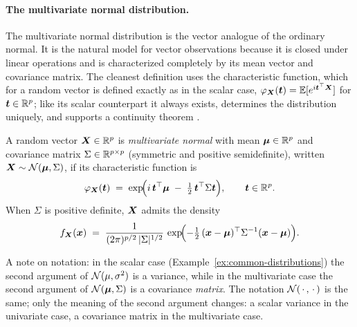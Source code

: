 \paragraph{The multivariate normal distribution.} The multivariate normal distribution is the vector analogue of the ordinary normal. It is the natural model for vector observations because it is closed under linear operations and is characterized completely by its mean vector and covariance matrix. The cleanest definition uses the characteristic function, which for a random vector is defined exactly as in the scalar case, \(\varphi_{\bm{X}}(\bm{t}) = \mathbb{E}[e^{i \bm{t}^{\top} \bm{X}}]\) for \(\bm{t} \in \mathbb{R}^p\); like its scalar counterpart it always exists, determines the distribution uniquely, and supports a continuity theorem \citep[][\S~29]{Billingsley1995}.

\begin{definition}\label{def:mvn}
A random vector \(\bm{X} \in \mathbb{R}^p\) is \emph{multivariate normal} with mean \(\bm{\mu} \in \mathbb{R}^p\) and covariance matrix \(\Sigma \in \mathbb{R}^{p \times p}\) (symmetric and positive semidefinite), written \(\bm{X} \sim \mathcal{N}(\bm{\mu}, \Sigma)\), if its characteristic function is
\begin{equation}
  \varphi_{\bm{X}}(\bm{t}) \;=\; \exp\!\Bigl(i\, \bm{t}^{\top} \bm{\mu} \;-\; \tfrac{1}{2}\, \bm{t}^{\top} \Sigma \bm{t}\Bigr), \qquad \bm{t} \in \mathbb{R}^p.
  \label{eq:mvn-cf}
\end{equation}
When \(\Sigma\) is positive definite, \(\bm{X}\) admits the density
\[
  f_{\bm{X}}(\bm{x}) \;=\; \frac{1}{(2 \pi)^{p/2}\, \lvert\Sigma\rvert^{1/2}}\, \exp\!\Bigl(-\tfrac{1}{2}\, (\bm{x} - \bm{\mu})^{\top} \Sigma^{-1} (\bm{x} - \bm{\mu})\Bigr).
\]
\end{definition}

A note on notation: in the scalar case (Example~\ref{ex:common-distributions}) the second argument of \(\mathcal{N}(\mu, \sigma^2)\) is a variance, while in the multivariate case the second argument of \(\mathcal{N}(\bm{\mu}, \Sigma)\) is a covariance \emph{matrix}. The notation \(\mathcal{N}(\,\cdot\,,\,\cdot\,)\) is the same; only the meaning of the second argument changes: a scalar variance in the univariate case, a covariance matrix in the multivariate case.

